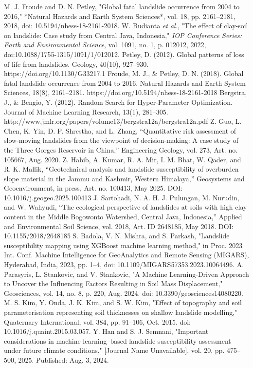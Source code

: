 \documentclass[conference]{IEEEtran}
\begin{document}
\begin{thebibliography}{00} 
 M. J. Froude and D. N. Petley, "Global fatal landslide occurrence from 2004 to 2016," *Natural Hazards and Earth System Sciences*, vol. 18, pp. 2161–2181, 2018, doi: 10.5194/nhess-18-2161-2018.
 W. Budianta \emph{et al.}, "The effect of clay-soil on landslide: Case study from Central Java, Indonesia," \emph{IOP Conference Series: Earth and Environmental Science}, vol. 1091, no. 1, p. 012012, 2022, doi:10.1088/1755-1315/1091/1/012012.
 Petley, D. (2012). Global patterns of loss of life from landslides. Geology, 40(10), 927–930. https://doi.org/10.1130/G33217.1
 Froude, M. J., \& Petley, D. N. (2018). Global fatal landslide occurrence from 2004 to 2016. Natural Hazards and Earth System Sciences, 18(8), 2161–2181. https://doi.org/10.5194/nhess-18-2161-2018
 Bergstra, J., \& Bengio, Y. (2012). Random Search for Hyper-Parameter Optimization. Journal of Machine Learning Research, 13(1), 281–305. http://www.jmlr.org/papers/volume13/bergstra12a/bergstra12a.pdf
 Z. Guo, L. Chen, K. Yin, D. P. Shrestha, and L. Zhang, “Quantitative risk assessment of slow-moving landslides from the viewpoint of decision-making: A case study of the Three Gorges Reservoir in China,” Engineering Geology, vol. 273, Art. no. 105667, Aug. 2020.
 Z. Habib, A. Kumar, R. A. Mir, I. M. Bhat, W. Qader, and R. K. Mallik, “Geotechnical analysis and landslide susceptibility of overburden slope material in the Jammu and Kashmir, Western Himalaya,” Geosystems and Geoenvironment, in press, Art. no. 100413, May 2025. DOI: 10.1016/j.geogeo.2025.100413
 J. Sartohadi, N. A. H. J. Pulungan, M. Nurudin, and W. Wahyudi, “The ecological perspective of landslides at soils with high clay content in the Middle Bogowonto Watershed, Central Java, Indonesia,” Applied and Environmental Soil Science, vol. 2018, Art. ID 2648185, May 2018. DOI: 10.1155/2018/2648185
 S. Badola, V. N. Mishra, and S. Parkash, "Landslide susceptibility mapping using XGBoost machine learning method," in Proc. 2023 Int. Conf. Machine Intelligence for GeoAnalytics and Remote Sensing (MIGARS), Hyderabad, India, 2023, pp. 1–4, doi: 10.1109/MIGARS57353.2023.10064496.
 A. Parasyris, L. Stankovic, and V. Stankovic, "A Machine Learning-Driven Approach to Uncover the Influencing Factors Resulting in Soil Mass Displacement," Geosciences, vol. 14, no. 8, p. 220, Aug. 2024. doi: 10.3390/geosciences14080220.
 M. S. Kim, Y. Onda, J. K. Kim, and S. W. Kim, "Effect of topography and soil parameterisation representing soil thicknesses on shallow landslide modelling," Quaternary International, vol. 384, pp. 91–106, Oct. 2015. doi: 10.1016/j.quaint.2015.03.057.
 Y. Han and S. J. Semnani, "Important considerations in machine learning–based landslide susceptibility assessment under future climate conditions," [Journal Name Unavailable], vol. 20, pp. 475–500, 2025. Published: Aug. 3, 2024.
\end{thebibliography}
\end{document}
